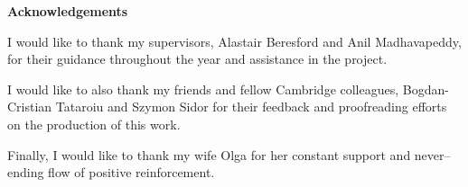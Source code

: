 \newpage
{\Huge \bf Acknowledgements}
\vspace{24pt}

I would like to thank my supervisors, Alastair Beresford and Anil Madhavapeddy, for their guidance throughout the year and assistance in the project.

I would like to also thank my friends and fellow Cambridge colleagues, Bogdan-Cristian Tataroiu and Szymon Sidor for their feedback and proofreading efforts on the production of this work.

Finally, I would like to thank my wife Olga for her constant support and never--ending flow of positive reinforcement.

\newpage
\vspace*{\fill}
